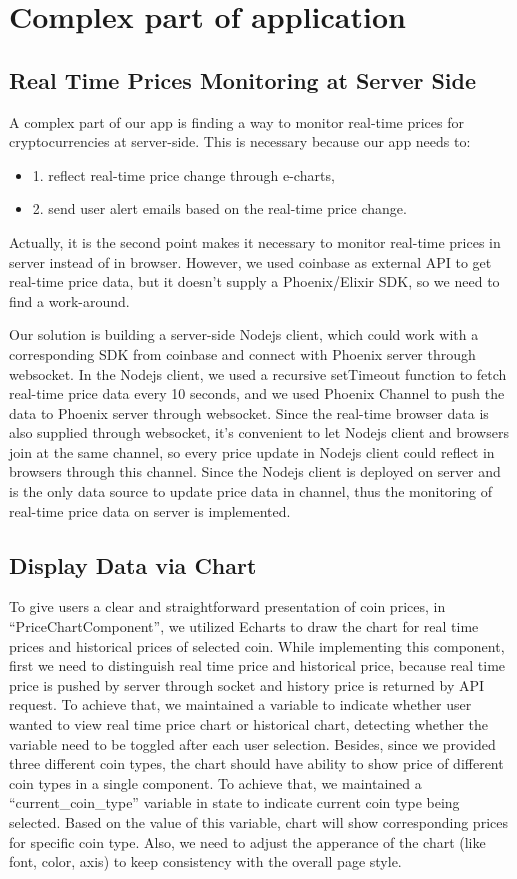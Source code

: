 \section{Complex part of application}
\subsection{Real Time Prices Monitoring at Server Side}
A complex part of our app is finding a way to monitor real-time 
prices for cryptocurrencies at server-side. This is necessary 
because our app needs to: 
\begin{itemize}
\item 1. reflect real-time price change 
through e-charts, 
\item 2. send user alert emails based on the 
real-time price change. 
\end{itemize}
Actually, it is the second point 
makes it necessary to monitor real-time prices in server 
instead of in browser. However, we used coinbase as external 
API to get real-time price data, but it doesn't supply a 
Phoenix/Elixir SDK, so we need to find a work-around. 

Our solution is building a server-side Nodejs client, which 
could work with a corresponding SDK from coinbase and connect 
with Phoenix server through websocket. In the Nodejs client, 
we used a recursive setTimeout function to fetch real-time 
price data every 10 seconds, and we used Phoenix Channel to 
push the data to Phoenix server through websocket. Since the 
real-time browser data is also supplied through websocket, 
it's convenient to let Nodejs client and browsers join at 
the same channel, so every price update in Nodejs client 
could reflect in browsers through this channel. Since the 
Nodejs client is deployed on server and is the only data 
source to update price data in channel, thus the monitoring 
of real-time price data on server is implemented.

\subsection{Display Data via Chart}
To give users a clear and straightforward presentation of 
coin prices, in “PriceChartComponent”, we utilized Echarts 
to draw the chart for real time prices and historical prices 
of selected coin. While implementing this component, first we 
need to distinguish real time price and historical price, 
because real time price is pushed by server through socket 
and history price is returned by API request. To achieve that, 
we maintained a variable to indicate whether user wanted to 
view real time price chart or historical chart, detecting 
whether the variable need to be toggled after each user 
selection. Besides, since we provided three different coin 
types, the chart should have ability to show price of different 
coin types in a single component. To achieve that, we maintained 
a “current\_coin\_type” variable in state to indicate current 
coin type being selected. Based on the value of this variable, 
chart will show corresponding prices for specific coin type. 
Also, we need to adjust the apperance of the chart (like 
font, color, axis) to keep consistency with the overall page style.



